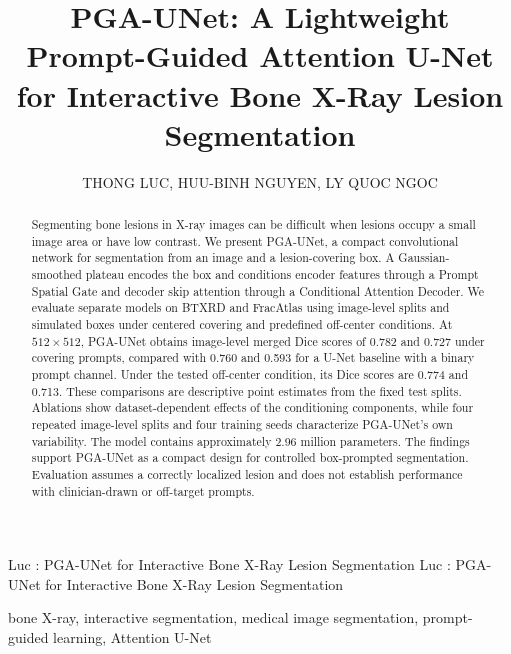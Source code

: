 \doi{}

\title{PGA-UNet: A Lightweight Prompt-Guided Attention U-Net for Interactive Bone X-Ray Lesion Segmentation}
\author{\uppercase{Thong Luc},
\uppercase{Huu-Binh Nguyen},
\uppercase{Ly Quoc Ngoc}}

\address[1]{B.Sc. Program in Computer Science, Faculty of Information Technology, University of Science, VNU-HCM, Vietnam}
\address[2]{Viet Nam National University, Ho Chi Minh City, Vietnam}

\markboth
{Luc \headeretal: PGA-UNet for Interactive Bone X-Ray Lesion Segmentation}
{Luc \headeretal: PGA-UNet for Interactive Bone X-Ray Lesion Segmentation}


\begin{abstract}
Segmenting bone lesions in X-ray images can be difficult when lesions occupy a small image area or have low contrast. We present PGA-UNet, a compact convolutional network for segmentation from an image and a lesion-covering box. A Gaussian-smoothed plateau encodes the box and conditions encoder features through a Prompt Spatial Gate and decoder skip attention through a Conditional Attention Decoder. We evaluate separate models on BTXRD and FracAtlas using image-level splits and simulated boxes under centered covering and predefined off-center conditions. At $512\times512$, PGA-UNet obtains image-level merged Dice scores of 0.782 and 0.727 under covering prompts, compared with 0.760 and 0.593 for a U-Net baseline with a binary prompt channel. Under the tested off-center condition, its Dice scores are 0.774 and 0.713. These comparisons are descriptive point estimates from the fixed test splits. Ablations show dataset-dependent effects of the conditioning components, while four repeated image-level splits and four training seeds characterize PGA-UNet's own variability. The model contains approximately 2.96 million parameters. The findings support PGA-UNet as a compact design for controlled box-prompted segmentation. Evaluation assumes a correctly localized lesion and does not establish performance with clinician-drawn or off-target prompts.
\end{abstract}

\begin{keywords}
bone X-ray, interactive segmentation, medical image segmentation, prompt-guided learning, Attention U-Net
\end{keywords}

\titlepgskip=-15pt
\maketitle
